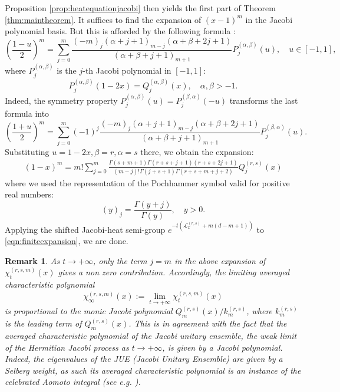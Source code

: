 \documentclass[12pt,reqno]{amsart}
\newtheorem{remark}{Remark}
\begin{document}
Proposition \ref{prop:heatequationjacobi} then yields the first part of Theorem \ref{thm:maintheorem}.
It suffices to find the expansion of $(x-1)^m$ in the Jacobi polynomial basis. But this is afforded by the following formula \cite{MR1697414}:
	\begin{equation*}
		\left(\frac{1-u}{2}\right)^m = \sum_{j=0}^m \frac{(-m)_j(\alpha+j+1)_{m-j}(\alpha+\beta+2j+1)}{(\alpha+\beta+j+1)_{m+1}}P_j^{(\alpha,\beta)}(u), \quad u \in [-1,1],
	\end{equation*}
	where $P_j^{(\alpha,\beta)}$ is the $j$-th Jacobi polynomial in $[-1,1]$:
	\begin{equation*}
		P_j^{(\alpha,\beta)}(1-2x) = Q_j^{(\alpha,\beta)}(x), \quad \alpha, \beta > -1.
	\end{equation*}
	Indeed, the symmetry property $P_j^{(\alpha,\beta)}(u) = P_j^{(\beta, \alpha)}(-u)$ transforms the last formula into
	\begin{equation*}
		\left(\frac{1+u}{2}\right)^m = \sum_{j=0}^m (-1)^j\frac{(-m)_j(\alpha+j+1)_{m-j}(\alpha+\beta+2j+1)}{(\alpha+\beta+j+1)_{m+1}}P_j^{(\beta,\alpha)}(u).
	\end{equation*}
	Substituting $u = 1-2x, \beta = r, \alpha = s$ there, we obtain the expansion:
	\begin{align}
    \label{eqn:finiteexpansion}
		(1-x)^m = m!\sum_{j=0}^m \frac{\Gamma(s+m+1)\Gamma(r+s+j+1)(r+s+2j+1)}
		{(m-j)!\Gamma(j+s+1)\Gamma(r+s+m+j+2)}Q_j^{(r,s)}(x)
	\end{align}
	where we used the representation of the Pochhammer symbol valid for positive real numbers: 
    \begin{equation*}
    (y)_j = \frac{\Gamma(y+j)}{\Gamma(y)}, \quad y > 0. 
    \end{equation*}
Applying the shifted Jacobi-heat semi-group
$   e^{-t(\mathcal{L}_x^{(r,s)}+m(d-m+1))}
$
to \eqref{eqn:finiteexpansion}, we are done.
\begin{remark}
\label{rk:longtime}
	As $t \rightarrow +\infty$, only the term $j=m$ in the above expansion of 
    $\chi_t^{(r,s,m)}(x)$ gives a non zero contribution.
	Accordingly, the limiting averaged characteristic polynomial
	\begin{equation*}
		\chi_{\infty}^{(r,s,m)}(x) := \lim_{t \rightarrow +\infty} \chi_t^{(r,s,m)}(x)
	\end{equation*}
	is proportional to the monic Jacobi polynomial $Q_{m}^{(r,s)}(x)/k_m^{(r,s)}$, where $k_m^{(r,s)}$ is the leading term of $Q_{m}^{(r,s)}(x)$. This is in agreement with the fact that the averaged characteristic polynomial of the Jacobi unitary ensemble, the weak limit of the Hermitian Jacobi process as $t \rightarrow +\infty$, is given by a Jacobi polynomial. Indeed, the eigenvalues of the JUE (Jacobi Unitary Ensemble) are given by a Selberg weight, as such its averaged characteristic polynomial is an instance of the celebrated Aomoto integral (see e.g. \cite{MR1985318}).
\end{remark}
\end{document}
